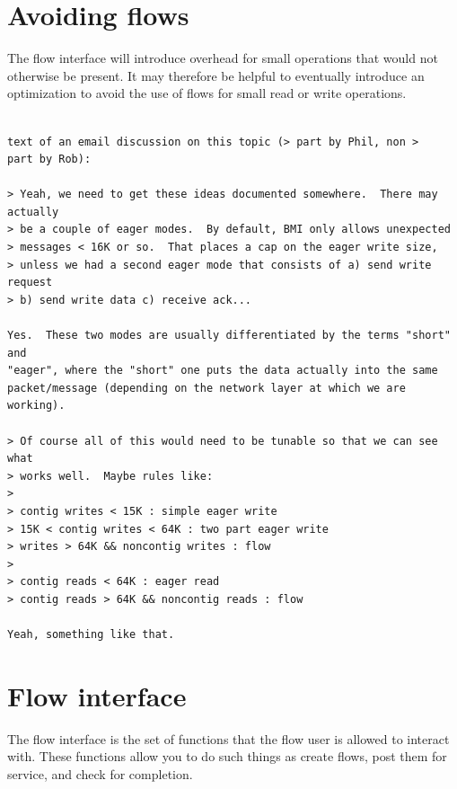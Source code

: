 \documentclass[12pt]{article} %
\begin{document}
\section{Avoiding flows}

The flow interface will introduce overhead for small operations
that would not otherwise be present.  It may therefore be helpful
to eventually introduce an optimization to avoid the use of flows
for small read or write operations.

\begin{verbatim}

text of an email discussion on this topic (> part by Phil, non >
part by Rob):

> Yeah, we need to get these ideas documented somewhere.  There may actually
> be a couple of eager modes.  By default, BMI only allows unexpected
> messages < 16K or so.  That places a cap on the eager write size,
> unless we had a second eager mode that consists of a) send write request
> b) send write data c) receive ack...

Yes.  These two modes are usually differentiated by the terms "short" and
"eager", where the "short" one puts the data actually into the same
packet/message (depending on the network layer at which we are working).

> Of course all of this would need to be tunable so that we can see what
> works well.  Maybe rules like:
> 
> contig writes < 15K : simple eager write
> 15K < contig writes < 64K : two part eager write
> writes > 64K && noncontig writes : flow
> 
> contig reads < 64K : eager read
> contig reads > 64K && noncontig reads : flow

Yeah, something like that.

\end{verbatim}

\section{Flow interface}

The flow interface is the set of functions that the flow user is allowed
to interact with.  These functions allow you to do such things as create
flows, post them for service, and check for completion.
\end{document}
